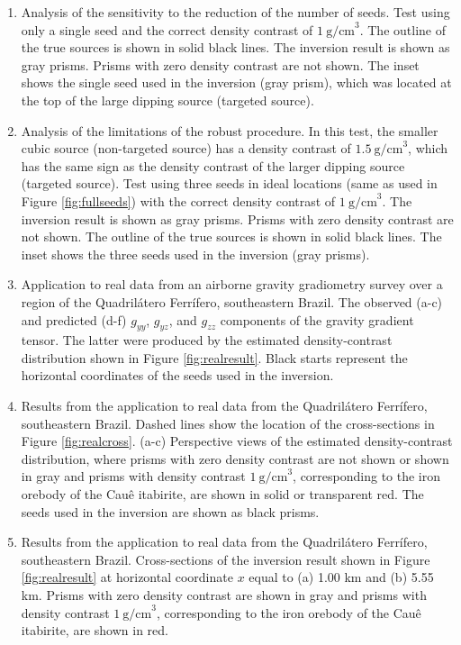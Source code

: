 \begin{enumerate}
\item \label{fig:oneseed}
    Analysis of the sensitivity to the reduction of the number of seeds.
    Test using only a single seed and the correct density contrast of
    $1\ \mathrm{g/cm}^3$.
    The outline of the true sources is shown in solid black lines.
    The inversion result is shown as gray prisms.
    Prisms with zero density contrast are not shown.
    The inset shows the single seed used in the inversion (gray prism),
    which was located at the top of
    the large dipping source (targeted source).
    
\item \label{fig:samesign}
    Analysis of the limitations of the robust procedure.
    In this test, the smaller cubic source (non-targeted source) has
    a density contrast of $1.5\ \mathrm{g/cm}^3$, which has the same sign as the
    density contrast of the larger dipping source (targeted source).
    Test using three seeds in ideal locations
    (same as used in Figure \ref{fig:fullseeds})
    with the correct density contrast of
    $1\ \mathrm{g/cm}^3$.
    The inversion result is shown as gray prisms.
    Prisms with zero density contrast are not shown.
    The outline of the true sources is shown in solid black lines.
    The inset shows the three seeds used in the inversion (gray prisms).

\item \label{fig:realdata}
    Application to real data from an airborne gravity
    gradiometry survey over a region of the Quadril\'atero Ferr\'ifero,
    southeastern Brazil. The observed (a-c) and predicted (d-f) $g_{yy}$,
    $g_{yz}$, and $g_{zz}$ components of the gravity gradient tensor.
    The latter were produced by the estimated density-contrast distribution
    shown in Figure \ref{fig:realresult}.
    Black starts represent the horizontal coordinates of the seeds used in the
    inversion.

\item \label{fig:realresult} 
    Results from the application to real data from the
    Quadril\'atero Ferr\'ifero, southeastern Brazil.
    Dashed lines show the location of the cross-sections in Figure
    \ref{fig:realcross}.
    (a-c)
    Perspective views of the estimated density-contrast distribution,
    where prisms with zero density contrast are not shown
    or shown in gray and
    prisms with density contrast $1\ \mathrm{g/cm}^3$,
    corresponding to the iron orebody of the Cau\^{e} itabirite,
    are shown in solid or transparent red.
    The seeds used in the inversion are shown as black prisms.

\item \label{fig:realcross}
    Results from the application to real data from the
    Quadril\'atero Ferr\'ifero, southeastern Brazil.
    Cross-sections of the inversion result shown in Figure
    \ref{fig:realresult}
    at horizontal coordinate $x$ equal to (a) 1.00 km and (b) 5.55 km.
    Prisms with zero density contrast are shown in gray and
    prisms with density contrast $1\ \mathrm{g/cm}^3$,
    corresponding to the iron orebody of the Cau\^{e} itabirite,
    are shown in red. 
\end{enumerate}



